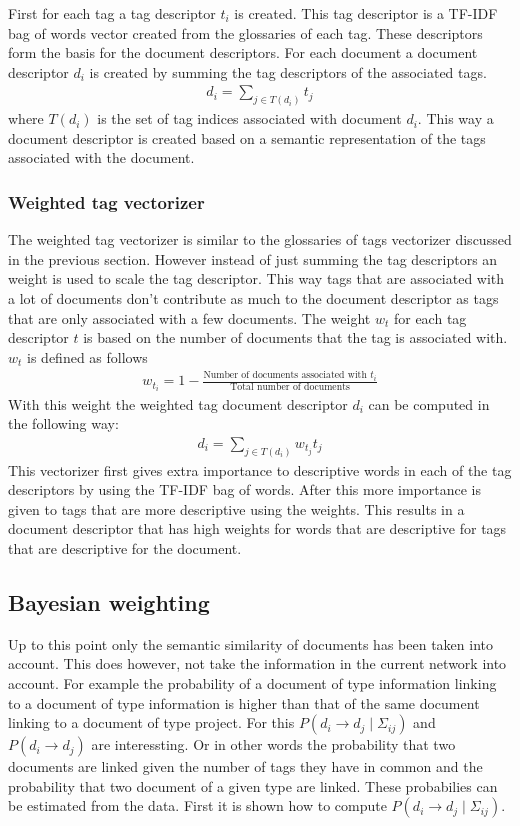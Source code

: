 First for each tag a tag descriptor $t_i$ is created. This tag descriptor is
a TF-IDF bag of words vector created from the glossaries of each tag. These
descriptors form the basis for the document descriptors. For each document
a document descriptor $d_i$ is created by summing the tag descriptors of the
associated tags.
\begin{align}
  d_i = \sum_{j \in T(d_i)} t_j
\end{align}
where $T(d_i)$ is the set of tag indices associated with document $d_i$. This
way a document descriptor is created based on a semantic representation of
the tags associated with the document.

\subsubsection{Weighted tag vectorizer}
The weighted tag vectorizer is similar to the glossaries of tags vectorizer
discussed in the previous section. However instead of just summing the tag
descriptors an weight is used to scale the tag descriptor. This way tags that
are associated with a lot of documents don't contribute as much to the document
descriptor as tags that are only associated with a few documents. The weight
$w_t$ for each tag descriptor $t$ is based on the number of documents that the
tag is associated with. $w_t$ is defined as follows
\begin{align}
  w_{t_i} = 1 - \frac{\textrm{Number of documents associated with $t_i$}}{\textrm{Total number of documents}}
\end{align}
With this weight the weighted tag document descriptor $d_i$ can be computed
in the following way:
\begin{align}
  d_i = \sum_{j \in T(d_i)} w_{t_j}t_j
\end{align}
This vectorizer first gives extra importance to descriptive words in each of
the tag descriptors by using the TF-IDF bag of words. After this more
importance is given to tags that are more descriptive using the weights. This
results in a document descriptor that has high weights for words that are
descriptive for tags that are descriptive for the document.

\subsection{Bayesian weighting}
Up to this point only the semantic similarity of documents has been taken into
account. This does however, not take the information in the current network
into account. For example the probability of a document of type information
linking to a document of type information is higher than that of the same
document linking to a document of type project. For this $P(d_i \to d_j \mid
\Sigma_{ij})$ and $P(d_i \to d_j)$ are interessting. Or in other words the
probability that two documents are linked given the number of tags they have in
common and the probability that two document of a given type are linked. These
probabilies can be estimated from the data. First it is shown how to compute
$P(d_i \to d_j \mid \Sigma_{ij})$.

